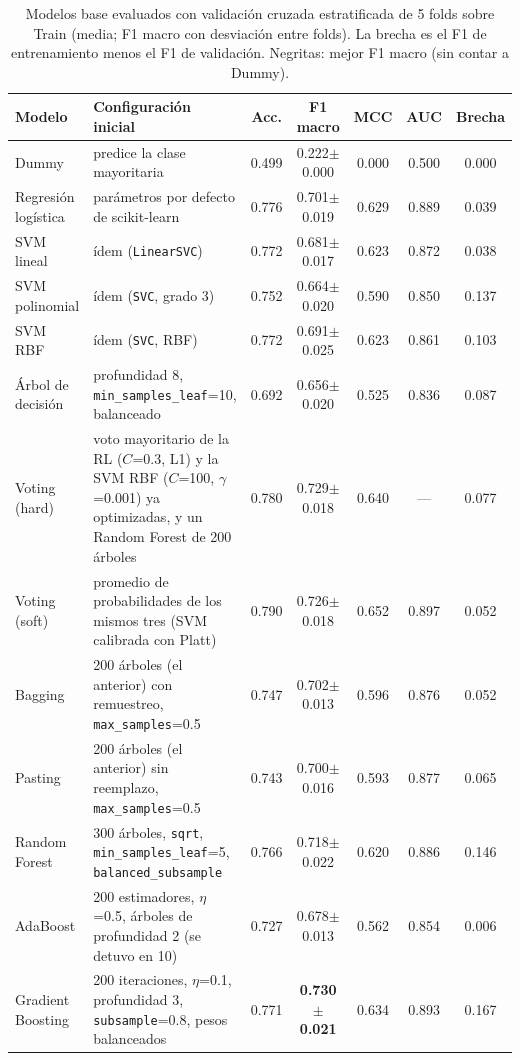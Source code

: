 \begin{table}[t]
\caption{Modelos base evaluados con validación cruzada estratificada de 5 folds sobre Train (media; F1 macro con desviación entre folds). La brecha es el F1 de entrenamiento menos el F1 de validación. Negritas: mejor F1 macro (sin contar a Dummy).}
\label{tab:base}
\centering\scriptsize
\setlength{\tabcolsep}{3pt}
\begin{tabular}{@{}p{2.9cm}p{7.6cm}ccccc@{}}
\toprule
Modelo & Configuración inicial & Acc. & F1 macro & MCC & AUC & Brecha \\
\midrule
Dummy & predice la clase mayoritaria & 0.499 & 0.222$\pm$0.000 & 0.000 & 0.500 & 0.000 \\
Regresión logística & parámetros por defecto de scikit-learn & 0.776 & 0.701$\pm$0.019 & 0.629 & 0.889 & 0.039 \\
SVM lineal & ídem (\texttt{LinearSVC}) & 0.772 & 0.681$\pm$0.017 & 0.623 & 0.872 & 0.038 \\
SVM polinomial & ídem (\texttt{SVC}, grado 3) & 0.752 & 0.664$\pm$0.020 & 0.590 & 0.850 & 0.137 \\
SVM RBF & ídem (\texttt{SVC}, RBF) & 0.772 & 0.691$\pm$0.025 & 0.623 & 0.861 & 0.103 \\
Árbol de decisión & profundidad 8, \texttt{min\_samples\_leaf}=10, balanceado & 0.692 & 0.656$\pm$0.020 & 0.525 & 0.836 & 0.087 \\
Voting (hard) & voto mayoritario de la RL ($C$=0.3, L1) y la SVM RBF ($C$=100, $\gamma$=0.001) ya optimizadas, y un Random Forest de 200 árboles & 0.780 & 0.729$\pm$0.018 & 0.640 & --- & 0.077 \\
Voting (soft) & promedio de probabilidades de los mismos tres (SVM calibrada con Platt) & 0.790 & 0.726$\pm$0.018 & 0.652 & 0.897 & 0.052 \\
Bagging & 200 árboles (el anterior) con remuestreo, \texttt{max\_samples}=0.5 & 0.747 & 0.702$\pm$0.013 & 0.596 & 0.876 & 0.052 \\
Pasting & 200 árboles (el anterior) sin reemplazo, \texttt{max\_samples}=0.5 & 0.743 & 0.700$\pm$0.016 & 0.593 & 0.877 & 0.065 \\
Random Forest & 300 árboles, \texttt{sqrt}, \texttt{min\_samples\_leaf}=5, \texttt{balanced\_subsample} & 0.766 & 0.718$\pm$0.022 & 0.620 & 0.886 & 0.146 \\
AdaBoost & 200 estimadores, $\eta$=0.5, árboles de profundidad 2 (se detuvo en 10) & 0.727 & 0.678$\pm$0.013 & 0.562 & 0.854 & 0.006 \\
Gradient Boosting & 200 iteraciones, $\eta$=0.1, profundidad 3, \texttt{subsample}=0.8, pesos balanceados & 0.771 & \textbf{0.730$\pm$0.021} & 0.634 & 0.893 & 0.167 \\

\end{tabular}
\end{table}
